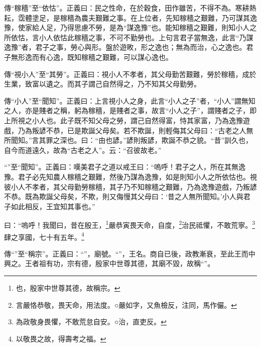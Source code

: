 {\noindent\zhuan{}\fzbyks 傳“稼穡”至“依怙”。正義曰：民之性命，在於穀食，田作雖苦，不得不為。寒耕熱耘，霑體塗足，是稼穡為農夫艱難之事。在上位者，先知稼穡之艱難，乃可謀其逸豫，使家給人足，乃得思慮不勞，是為“謀逸豫”也。能知稼穡之艱難，則知小人之所依怙，言小人依怙此稼穡之事，不可不勤勞也。上句言君子當無逸，此言“乃謀逸豫”者，君子之事，勞心與形。盤於遊畋，形之逸也；無為而治，心之逸也。君子無形逸而有心逸，既知稼穡之艱難，可以謀心逸也。 \par}

{\noindent\zhuan{}\fzbyks 傳“視小人”至“其勞”。正義曰：視小人不孝者，其父母勤苦艱難，勞於稼穡，成於生業，致富以遺之。而其子謂己自然得之，乃不知其父母勤勞。 \par}

{\noindent\zhuan{}\fzbyks 傳“小人”至“聞知”。正義曰：上言視小人之身，此言“小人之子”者，“小人”謂無知之人，亦是賤者之稱，躬為稼穡，是賤者之事，故言“小人之子”，謂賤者之子，即上所視之小人也。此子既不知父母之勞，謂己自然得富，恃其家富，乃為逸豫遊戲，乃為叛諺不恭，已是欺誕父母矣。若不欺誕，則輕侮其父母曰：“古老之人無所聞知。”言其罪之深也。曰：“由也諺。”諺則叛諺，欺誕不恭之貌。“昔”訓久也，自今而道遠久，故為“古老之人”。云：“召彼故老。” \par}

{\noindent\shu{}\fzkt “”至“聞知”。正義曰：嘆美君子之道以戒王曰：“嗚呼！君子之人，所在其無逸豫。君子必先知農人稼穡之艱難，然後乃謀為逸豫，如是則知小人之所依怙也。視彼小人不孝者，其父母勤勞稼穡，其子乃不知稼穡之艱難，乃為逸豫遊戲，乃叛諺不恭。既為欺誕父母矣，不欺，則又侮慢其父母曰：‘昔之人無所聞知。’小人與君子如此相反，王宜知其事也。” \par}

曰：“嗚呼！我聞曰，昔在殷王，\footnote{也，殷家中世尊其德，故稱宗。}嚴恭寅畏天命，自度，\footnote{言嚴恪恭敬，畏天命，用法度。○嚴如字，又魚檢反，注同，馬作儼。}治民祗懼，不敢荒寧。\footnote{為政敬身畏懼，不敢荒怠自安。○治，直吏反。}肆之享國，七十有五年。\footnote{以敬畏之故，得壽考之福。}


{\noindent\zhuan{}\fzbyks 傳“”至“稱宗”。正義曰：“”，廟號。“”，王名。商自已後，政教漸衰，至此王而中興之。王者祖有功，宗有德，殷家中世尊其德，其廟不毀，故稱“”。 \par}

